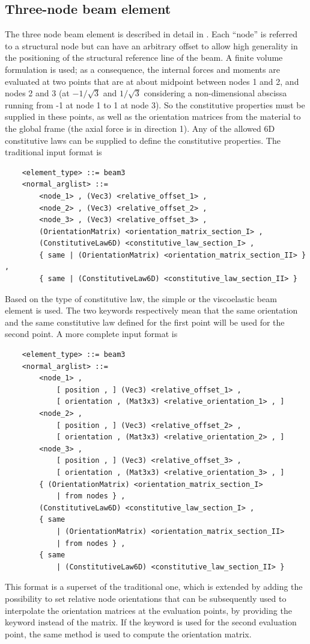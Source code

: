 \subsection{Three-node beam element}
The three node beam element is described in detail in \cite{FV-AIAA}.
Each ``node'' is referred to a structural node but can have an arbitrary
offset to allow high generality in the positioning of the structural 
reference line of the beam.
A finite volume formulation is used;
as a consequence, the internal forces and moments are evaluated 
at two points that are at about midpoint between nodes 1 and 2, 
and nodes 2 and 3 (at $ -1/\sqrt{3} $ and $1/\sqrt{3}$ considering
a non-dimensional abscissa running from -1 at node 1 to 1 at node 3).
So the constitutive properties must be supplied in these points, as well as
the orientation matrices from the material to the global frame (the axial force
is in direction 1).
Any of the allowed 6D constitutive laws can be supplied to define the
constitutive properties.
The traditional input format is
\begin{verbatim}
    <element_type> ::= beam3
    <normal_arglist> ::=
        <node_1> , (Vec3) <relative_offset_1> ,
        <node_2> , (Vec3) <relative_offset_2> ,
        <node_3> , (Vec3) <relative_offset_3> ,
        (OrientationMatrix) <orientation_matrix_section_I> ,
        (ConstitutiveLaw6D) <constitutive_law_section_I> ,
        { same | (OrientationMatrix) <orientation_matrix_section_II> } ,
        { same | (ConstitutiveLaw6D) <constitutive_law_section_II> }
\end{verbatim}
Based on the type of constitutive law, the simple or the viscoelastic beam
element is used.
The two keywords  respectively mean that the same orientation 
and the same constitutive law defined for the first point will be used 
for the second point.
A more complete input format is
\begin{verbatim}
    <element_type> ::= beam3
    <normal_arglist> ::=
        <node_1> ,
            [ position , ] (Vec3) <relative_offset_1> ,
            [ orientation , (Mat3x3) <relative_orientation_1> , ]
        <node_2> ,
            [ position , ] (Vec3) <relative_offset_2> ,
            [ orientation , (Mat3x3) <relative_orientation_2> , ]
        <node_3> ,
            [ position , ] (Vec3) <relative_offset_3> ,
            [ orientation , (Mat3x3) <relative_orientation_3> , ]
        { (OrientationMatrix) <orientation_matrix_section_I>
            | from nodes } ,
        (ConstitutiveLaw6D) <constitutive_law_section_I> ,
        { same
            | (OrientationMatrix) <orientation_matrix_section_II>
            | from nodes } ,
        { same
            | (ConstitutiveLaw6D) <constitutive_law_section_II> }
\end{verbatim}
This format is a superset of the traditional one, which is extended
by adding the possibility to set relative node orientations
that can be subsequently used to interpolate the orientation matrices
at the evaluation points, by providing the keyword 
instead of the matrix.
If the keyword  is used for the second evaluation point,
the same method is used to compute the orientation matrix.

